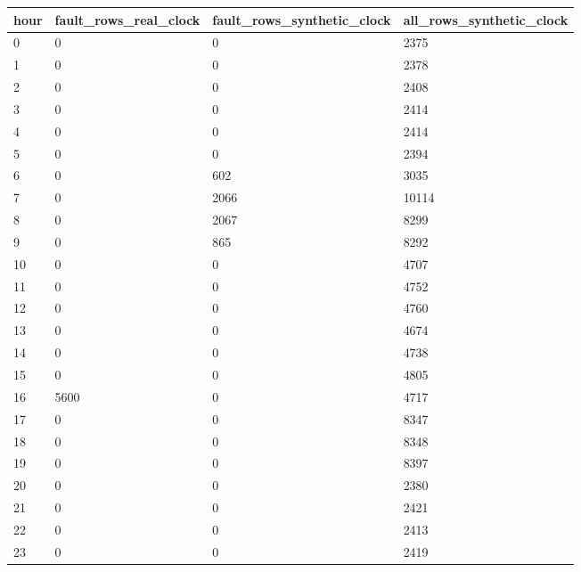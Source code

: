 \begin{tabular}{llll}
\toprule
hour & fault\_rows\_real\_clock & fault\_rows\_synthetic\_clock & all\_rows\_synthetic\_clock \\
\midrule
0 & 0 & 0 & 2375 \\
1 & 0 & 0 & 2378 \\
2 & 0 & 0 & 2408 \\
3 & 0 & 0 & 2414 \\
4 & 0 & 0 & 2414 \\
5 & 0 & 0 & 2394 \\
6 & 0 & 602 & 3035 \\
7 & 0 & 2066 & 10114 \\
8 & 0 & 2067 & 8299 \\
9 & 0 & 865 & 8292 \\
10 & 0 & 0 & 4707 \\
11 & 0 & 0 & 4752 \\
12 & 0 & 0 & 4760 \\
13 & 0 & 0 & 4674 \\
14 & 0 & 0 & 4738 \\
15 & 0 & 0 & 4805 \\
16 & 5600 & 0 & 4717 \\
17 & 0 & 0 & 8347 \\
18 & 0 & 0 & 8348 \\
19 & 0 & 0 & 8397 \\
20 & 0 & 0 & 2380 \\
21 & 0 & 0 & 2421 \\
22 & 0 & 0 & 2413 \\
23 & 0 & 0 & 2419 \\
\bottomrule
\end{tabular}
